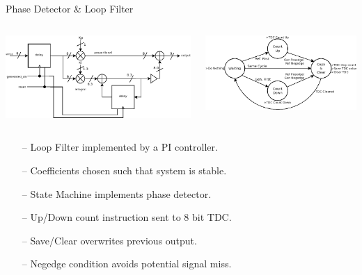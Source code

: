 \documentclass{beamer}
\begin{document}
\begin{frame}{Phase Detector \& Loop Filter}
 	\begin{columns}
 	\begin{center}
        \includegraphics[scale=0.20]{../loop_filter.png}
 	\end{center}
 	\begin{center}
        \includegraphics[scale=0.20]{../state_trans_diagram.png}
 	\end{center}

    \end{columns}		
	\begin{itemize}
		\item[--]
            Loop Filter implemented by a PI controller.
        \item[--]
            Coefficients chosen such that system is stable. %
        \item[--]
            State Machine implements phase detector.
        \item[--]
            Up/Down count instruction sent to 8 bit TDC.
        \item[--]
            Save/Clear overwrites previous output.
        \item[--]
            Negedge condition avoids potential signal miss.
    \end{itemize}
\end{frame}
\end{document}
